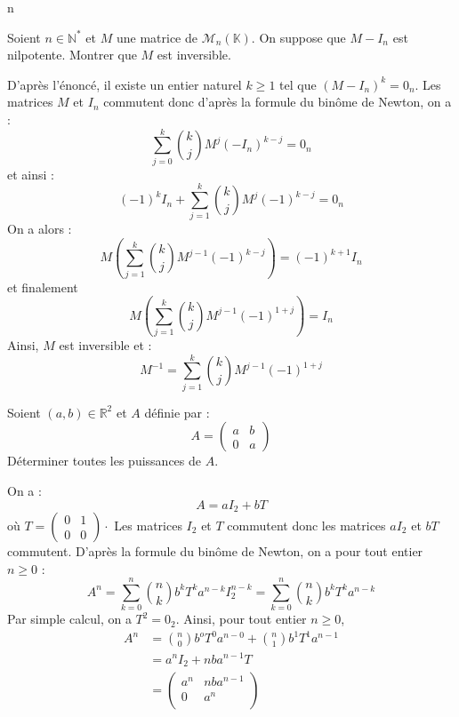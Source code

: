 n\documentclass[a4paper,10pt]{report}
\begin{document}
\begin{Exercice}{} Soient $n \in \mathbb{N}^*$ et $M$ une matrice de $\mathcal{M}_n(\mathbb{K})$. On suppose que $M-I_n$ est nilpotente. Montrer que $M$ est inversible.
\end{Exercice} 

\corr D'après l'énoncé, il existe un entier naturel $k \geq 1$ tel que $(M-I_n)^k = 0_n$. Les matrices $M$ et $I_n$ commutent donc d'après la formule du binôme de Newton, on a :
$$ \sum_{j=0}^k \binom{k}{j} M^j (-I_n)^{k-j} = 0_n$$
et ainsi :
$$ (-1)^k I_n + \sum_{j=1}^k \binom{k}{j} M^j (-1)^{k-j} = 0_n$$
On a alors :
$$ M \left(\sum_{j=1}^k \binom{k}{j} M^{j-1} (-1)^{k-j} \right) = (-1)^{k+1} I_n$$
et finalement 
$$ M \left(\sum_{j=1}^k \binom{k}{j} M^{j-1} (-1)^{1+j} \right)= I_n$$
Ainsi, $M$ est inversible et :
$$ M^{-1} = \sum_{j=1}^k \binom{k}{j} M^{j-1} (-1)^{1+j} $$

\medskip

\begin{Exercice}{} Soient $(a,b) \in \mathbb{R}^2$ et $A$ définie par :
$$ A = \begin{pmatrix}
a & b \\
0  & a
\end{pmatrix}$$ 
Déterminer toutes les puissances de $A$.
\end{Exercice}

\corr On a :
$$ A = a I_2 + b T$$
où $T = \begin{pmatrix}
0 & 1 \\
0 & 0
\end{pmatrix} \cdot$ Les matrices $I_2$ et $T$ commutent donc les matrices $a I_2$ et $bT$ commutent. D'après la formule du binôme de Newton, on a pour tout entier $n \geq 0$ :
$$ A^n = \sum_{k=0}^n \binom{n}{k} b^k T^k a^{n-k} I_2^{n-k} = \sum_{k=0}^n \binom{n}{k} b^k T^k a^{n-k} $$
Par simple calcul, on a $T^2 = 0_2$. Ainsi, pour tout entier $n \geq 0$,
\begin{align*}
 A^n  &= \binom{n}{0} b^o T^0 a^{n-0} + \binom{n}{1} b^1 T^1 a^{n-1} \\
 & = a^n I_2 + nba^{n-1} T \\
 & = \begin{pmatrix}
 a^n & nba^{n-1} \\
 0 & a^n \\
 \end{pmatrix}
 \end{align*}
%
%
\end{document}
